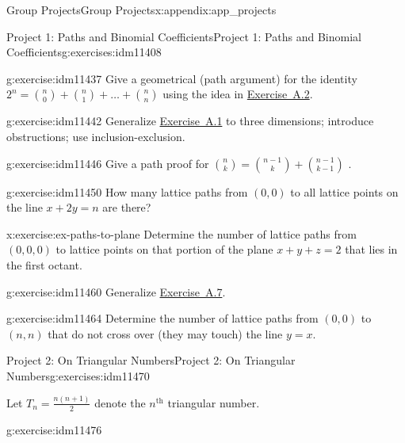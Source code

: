 \documentclass[oneside,10pt,]{book}
\numberwithin{equation}{chapter}
\begin{document}
\begin{appendixptx}{Group Projects}{}{Group Projects}{}{}{x:appendix:app_projects}
\begin{exercises-section-numberless}{Project 1: Paths and Binomial Coefficients}{}{Project 1: Paths and Binomial Coefficients}{}{}{g:exercises:idm11408}
\begin{divisionexercise}{3}{}{}{g:exercise:idm11437}
Give a geometrical (path argument) for the identity \(2^{n} =
\binom{n}{0}
+
\binom{n}{1}
+ \ldots +
\binom{n}{n}\) using the idea in \hyperlink{x:exercise:ex-paths-on-lines}{Exercise~A.2}.%
\end{divisionexercise}%
\begin{divisionexercise}{4}{}{}{g:exercise:idm11442}%
Generalize \hyperlink{x:exercise:ex-count-paths}{Exercise~A.1} to three dimensions; introduce obstructions; use inclusion-exclusion.%
\end{divisionexercise}%
\begin{divisionexercise}{5}{}{}{g:exercise:idm11446}%
Give a path proof for \(\binom{n}{k}
=
\binom{n - 1}{k}
+
\binom{n - 1}{k - 1}\) .%
\end{divisionexercise}%
\begin{divisionexercise}{6}{}{}{g:exercise:idm11450}%
How many lattice paths from \(\left( 0,0 \right)\) to all lattice points on the line \(x + 2y = n\) are there?%
\end{divisionexercise}%
\begin{divisionexercise}{7}{}{}{x:exercise:ex-paths-to-plane}%
Determine the number of lattice paths from \(\left( 0,0,0 \right)\) to lattice points on that portion of the plane \(x + y + z = 2\) that lies in the first octant.%
\end{divisionexercise}%
\begin{divisionexercise}{8}{}{}{g:exercise:idm11460}%
Generalize \hyperlink{x:exercise:ex-paths-to-plane}{Exercise~A.7}.%
\end{divisionexercise}%
\begin{divisionexercise}{9}{}{}{g:exercise:idm11464}%
Determine the number of lattice paths from \(\left( 0,0 \right)\) to \((n,n)\) that do not cross over (they may touch) the line \(y = x\).%
\end{divisionexercise}%
\end{exercises-section-numberless}
%
%
\typeout{************************************************}
\typeout{************************************************}
%
\begin{exercises-section-numberless}{Project 2: On Triangular Numbers}{}{Project 2: On Triangular Numbers}{}{}{g:exercises:idm11470}
\begin{introduction}{}%
Let \(T_{n} = \frac{n\left( n + 1 \right)}{2}\) denote the \(n^{\text{th}}\) triangular number.%
\end{introduction}%
\begin{divisionexercise}{1}{}{}{g:exercise:idm11476}%

\end{divisionexercise}
\end{exercises-section-numberless}
\end{appendixptx}
\end{document}
